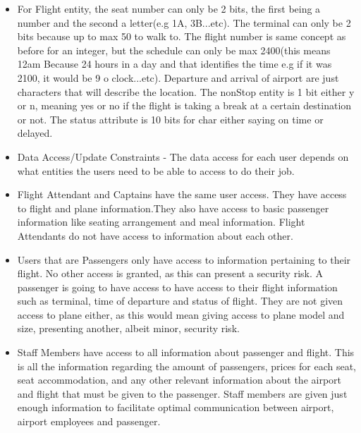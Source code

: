 \documentclass[10pt,conference]{IEEEtran}
\begin{document}
\begin{itemize} \item{For Flight entity, the seat number can only be 2 bits, the first being a number and the second a letter(e.g 1A, 3B...etc). The terminal can only be 2 bits because up to max 50 to walk to. The flight number is same concept as before for an integer, but the schedule can only be max 2400(this means 12am  Because 24 hours in a day and that identifies the time e.g if it was 2100, it would be 9 o clock...etc). Departure and arrival of airport are just characters that will describe the location. The nonStop entity is 1 bit either y or n, meaning yes or no if the flight is taking a break at a certain destination or not. The status attribute is 10 bits for char either saying on time or delayed.} \end{itemize} 



\begin{itemize} \item{Data Access/Update Constraints - The data access for each user depends on what entities the users need to be able to access to do their job.} \end{itemize} 

\begin{itemize} \item{Flight Attendant and Captains have the same user access. They have access to flight and plane information.They also have access to basic passenger information like seating arrangement and meal information. Flight Attendants do not have access to information about each other.} \end{itemize} 

\begin{itemize} \item{Users that are Passengers only have access to information pertaining to their flight. No other access is granted, as this can present a security risk. A passenger is going to have access to have access to their flight information such as terminal, time of departure and status of flight. They are not given access to plane either, as this would mean giving access to plane model and size, presenting another, albeit minor, security risk.} \end{itemize} 

\begin{itemize} \item{Staff Members have access to all information about passenger and flight. This is all the information regarding the amount of passengers, prices for each seat, seat accommodation, and any other relevant information about the airport and flight that must be given to the passenger. Staff members are given just enough information to facilitate optimal communication between airport, airport employees and passenger.} \end{itemize} 
\end{document}

